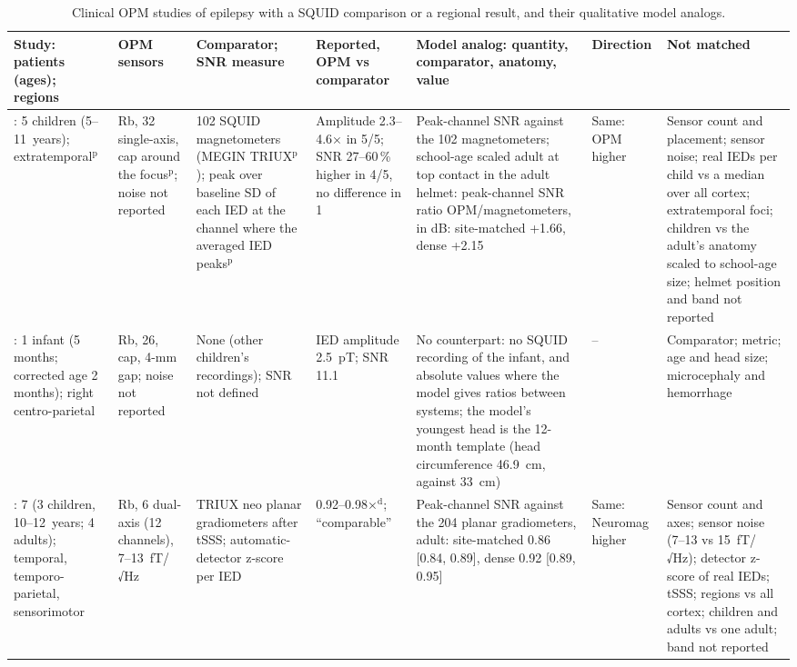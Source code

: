 \documentclass[preprint,12pt,authoryear,a4paper]{elsarticle}
\begin{document}
\begin{table}
\caption{Clinical OPM studies of epilepsy with a SQUID comparison or a regional result, and their qualitative model analogs.}\label{tab:S19}
\scriptsize
\setlength{\tabcolsep}{3pt}
\begin{tabular}{L{2.7cm}L{2.1cm}L{2.9cm}L{3.3cm}L{5.7cm}L{2.2cm}L{4.1cm}}
\toprule
Study: patients (ages); regions & OPM sensors & Comparator; SNR measure & Reported, OPM vs comparator & Model analog: quantity, comparator, anatomy, value & Direction & Not matched \\
\midrule
\citet{feys2022}: 5 children (5--11~years); extratemporal$^{\mathrm{p}}$ & Rb, 32 single-axis, cap around the focus$^{\mathrm{p}}$; noise not reported & 102 SQUID magnetometers (MEGIN TRIUX$^{\mathrm{p}}$); peak over baseline SD of each IED at the channel where the averaged IED peaks$^{\mathrm{p}}$ & Amplitude 2.3--4.6× in 5/5; SNR 27--60\,\% higher in 4/5, no difference in 1 & Peak-channel SNR against the 102 magnetometers; school-age scaled adult at top contact in the adult helmet: peak-channel SNR ratio OPM/magnetometers, in dB: site-matched +1.66, dense +2.15 & Same: OPM higher & Sensor count and placement; sensor noise; real IEDs per child vs a median over all cortex; extratemporal foci; children vs the adult's anatomy scaled to school-age size; helmet position and band not reported \\
\citet{feys2023}: 1 infant (5 months; corrected age 2 months); right centro-parietal & Rb, 26, cap, 4-mm gap; noise not reported & None (other children's recordings); SNR not defined & IED amplitude 2.5~pT; SNR 11.1 & No counterpart: no SQUID recording of the infant, and absolute values where the model gives ratios between systems; the model's youngest head is the 12-month template (head circumference 46.9~cm, against 33~cm) & -- & Comparator; metric; age and head size; microcephaly and hemorrhage \\
\citet{hillebrand2023}: 7 (3 children, 10--12~years; 4 adults); temporal, temporo-parietal, sensorimotor & Rb, 6 dual-axis (12 channels), 7--13~fT/√Hz & TRIUX neo planar gradiometers after tSSS; automatic-detector z-score per IED & 0.92--0.98×$^{\mathrm{d}}$; ``comparable'' & Peak-channel SNR against the 204 planar gradiometers, adult: site-matched 0.86 [0.84, 0.89], dense 0.92 [0.89, 0.95] & Same: Neuromag higher & Sensor count and axes; sensor noise (7--13 vs 15~fT/√Hz); detector z-score of real IEDs; tSSS; regions vs all cortex; children and adults vs one adult; band not reported \\

\end{tabular}
\end{table}
\end{document}
